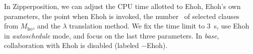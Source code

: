
  In Zipperposition, we can adjust the CPU time allotted to Ehoh, Ehoh's own
  parameters, the point when Ehoh is invoked, the number \ParamNumClauses~of selected clauses from
  $M_\mathrm{ho}$, and the $\lambda$ translation method. We fix the time
  limit to 3~s, use Ehoh in \emph{autoschedule} mode, and focus on the last three
  parameters. In \emph{base}, collaboration with Ehoh is
  disabled (labeled $-$Ehoh).

